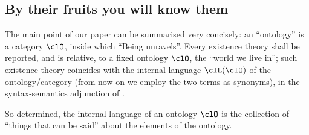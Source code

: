 \subsection{By their fruits you will know them}\label{frutti}



The main point of our paper can be summarised very concisely: an ``ontology'' is a category $\clO$, inside which ``Being unravels''. Every existence theory shall be reported, and is relative, to a fixed ontology $\clO$, the ``world we live in''; such existence theory coincides with the internal language $\clL(\clO)$ of the ontology/category (from now on we employ the two terms as synonyms), in the syntax\hyp{}semantics adjunction of \cite{syntax-semantics_duality}.

So determined, the internal language of an ontology $\clO$ is the collection of ``things that can be said'' about the elements of the ontology.

